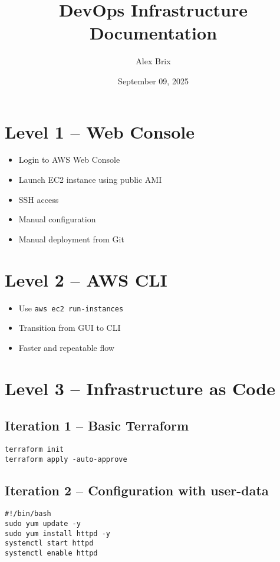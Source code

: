 \documentclass{article}
\title{DevOps Infrastructure Documentation}
\author{Alex Brix}
\date{September 09, 2025}
\begin{document}
\maketitle

\section{Level 1 – Web Console}
\begin{itemize}
  \item Login to AWS Web Console
  \item Launch EC2 instance using public AMI
  \item SSH access
  \item Manual configuration
  \item Manual deployment from Git
\end{itemize}

\section{Level 2 – AWS CLI}
\begin{itemize}
  \item Use \texttt{aws ec2 run-instances}
  \item Transition from GUI to CLI
  \item Faster and repeatable flow
\end{itemize}

\section{Level 3 – Infrastructure as Code}

\subsection{Iteration 1 – Basic Terraform}
\begin{verbatim}
terraform init
terraform apply -auto-approve
\end{verbatim}

\subsection{Iteration 2 – Configuration with user-data}
\begin{verbatim}
#!/bin/bash
sudo yum update -y
sudo yum install httpd -y
systemctl start httpd
systemctl enable httpd
\end{verbatim}
\end{document}
